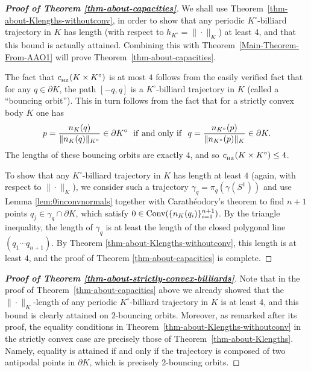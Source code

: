 \documentclass[11pt]{article}
\begin{document}
{\begin{proof}[{\bf Proof of Theorem \ref{thm-about-capacities}}]

We shall use Theorem~\ref{thm-about-Klengths-withoutconv}, in order to show that any periodic $K^{\circ}$-billiard trajectory in $K$ has length (with respect to $h_{K^{\circ}} = \| \cdot \|_K$) at least 4, and that this bound is actually attained. Combining this with Theorem~\ref{Main-Theorem-From-AAO1} will prove Theorem~\ref{thm-about-capacities}.

The fact that $c_{_{\rm HZ}}(K\times K^{\circ})$ is at most $4$ follows from the easily verified fact that for any $q\in \partial K$, the path $[-q,q]$ is a $K^{\circ}$-billiard trajectory in $K$ (called a ``bouncing orbit''). This in turn  follows from the fact that for a strictly convex body $K$ one has  
\begin{equation} \label{formula-for-normal}
p = \frac{n_K(q)}{\|n_K(q)\|_{K^{\circ}}} \in \partial K^{\circ} \ \  {\rm if \ and \ only \ if \ \ } q = \frac{n_{K^{\circ}}(p)}{\|n_{K^{\circ}}(p)\|_K} \in \partial K.
\end{equation}
The lengths %
of these bouncing orbits are exactly $4$, and so $c_{_{\rm HZ}}(K\times K^{\circ}) \le 4$. 

To show that any $K^{\circ}$-billiard trajectory in $K$ has length at least $4$ (again, with respect to $\| \cdot \|_K$), we consider such a trajectory $\gamma_q=\pi_q(\gamma(S^1))$ and use Lemma \ref{lem:0inconvnormals} together with Carath\'eodory's theorem to find $n+1$ points $q_j\in \gamma_q \cap \partial K$, which satisfy $0\in {\rm Conv}(\{n_K(q_i)\}_{i=1}^{n+1})$. By the triangle inequality, the length of $\gamma_q$ %
is at least the length of the closed polygonal line $(q_1\cdots q_{n+1})$. By Theorem \ref{thm-about-Klengths-withoutconv}, this length is at least $4$, and the proof of Theorem \ref{thm-about-capacities} is complete. 
\end{proof}



\begin{proof}[{\bf Proof of Theorem \ref{thm-about-strictly-convex-billiards}}]
Note that in the proof of Theorem~\ref{thm-about-capacities} above we already showed that the $\| \cdot \|_K$-length of any periodic $K^{\circ}$-billiard trajectory in $K$ is at least 4, and this bound is clearly attained on $2$-bouncing orbits.  Moreover, as remarked after its proof, the equality conditions in Theorem~\ref{thm-about-Klengths-withoutconv} in the strictly convex
case are precisely those of Theorem~\ref{thm-about-Klengths}. Namely, equality is attained if and only if the trajectory is composed of two antipodal points in $\partial K$, which
is precisely $2$-bouncing orbits.
\end{proof}


}
\end{document}
